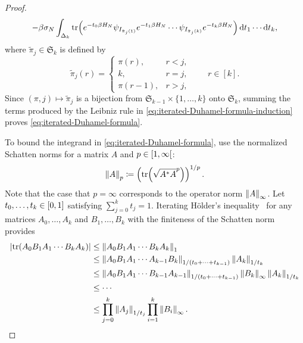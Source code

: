 \documentclass[../CLT_SYK.tex]{subfiles}
\begin{document}
\begin{proof}
\begin{align*}
    -\beta\sigma_N
    \int_{\Delta_k}
    \tr\mleft(
      e^{-t_0\beta H_N}
      \psi_{I_{\tilde{\pi}_{j}(1)}}
      e^{-t_1\beta H_N}
      \cdots
      \psi_{I_{\tilde{\pi}_{j}(k)}}
      e^{-t_k\beta H_N}
    \mright)
    \odif{t_1} \cdots \odif{t_k},
  \end{align*}
  where $\tilde\pi_j\in\mathfrak{S}_k$ is defined by
  \[
    \tilde{\pi}_{j}(r)
    =
    \begin{cases}
      \pi(r),   & r<j, \\
      k,        & r=j, \\
      \pi(r-1), & r>j,
    \end{cases}\qquad r\in[k].
  \]
  Since $(\pi, j) \mapsto \tilde{\pi}_{j}$ is a bijection from
  $\mathfrak{S}_{k-1}\times\{1,\ldots,k\}$ onto $\mathfrak{S}_k$, summing the terms produced by the Leibniz rule in
  \eqref{eq:iterated-Duhamel-formula-induction} proves
  \eqref{eq:iterated-Duhamel-formula}.

  To bound the integrand in \eqref{eq:iterated-Duhamel-formula}, use the normalized Schatten norms for a matrix $A$ and $p \in \interval[open right]{1}{\infty}$:
  \[
    \norm{A}_p \coloneqq \left(\tr\mleft(\sqrt{A^* A}^p\mright)\right)^{1/p}.
  \]
  Note that the case that $p=\infty$ corresponds to the operator norm $\left\lVert A\right\rVert_\infty$.
  Let $t_0, \ldots, t_k \in \interval{0}{1}$ satisfying $\sum_{j=0}^k t_j = 1$. 
  Iterating H\"older's inequality~\cite[Theorem~6.20]{HiaiPetz2014} for any matrices $A_0, \ldots, A_k$ and $B_1, \ldots, B_k$ with the finiteness of the Schatten norm provides
  \begin{align*}
    \left|\operatorname{tr}(A_0 B_1 A_1 \cdots B_k A_k)\right|
    & \leq
      \left\lVert A_0 B_1 A_1 \cdots B_k A_k\right\rVert_1\\
    & \leq
      \left\lVert A_0 B_1 A_1 \cdots A_{k-1} B_k\right\rVert_{1/(t_0+\cdots+t_{k-1})}
      \left\lVert A_k\right\rVert_{1/t_k} \\
    & \leq
      \left\lVert A_0 B_1 A_1 \cdots B_{k-1} A_{k-1}\right\rVert_{1/(t_0+\cdots+t_{k-1})}
      \left\lVert B_k\right\rVert_\infty
      \left\lVert A_k\right\rVert_{1/t_k} \\
    & \leq
      \cdots \\
    & \leq
      \prod_{j=0}^{k} \left\lVert A_j\right\rVert_{1/t_j}
      \prod_{i=1}^{k} \left\lVert B_i\right\rVert_\infty.
  \end{align*}


\end{proof}
\end{document}

